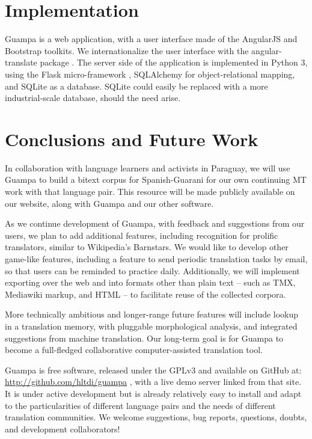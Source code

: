 \documentclass[10pt, a4paper]{article}
\begin{document}
\section{Implementation}
Guampa is a web application, with a user interface made of the AngularJS
\cite{angularjs} and Bootstrap \cite{bootstrap} toolkits. We internationalize
the user interface with the angular-translate package \cite{angular-translate}.
The server side of the application is implemented in Python 3, using the Flask
micro-framework \cite{flask}, SQLAlchemy
\cite{sqlalchemy} for object-relational mapping, and SQLite \cite{sqlite} as a
database. SQLite could easily be replaced with a more industrial-scale
database, should the need arise.

\section{Conclusions and Future Work}
In collaboration with language learners and activists in Paraguay, we will use
Guampa to build a bitext corpus for Spanish-Guarani for our own continuing MT
work with that language pair. This resource will be made publicly available on
our website, along with Guampa and our other software.

As we continue development of Guampa, with feedback and suggestions from our
users, we plan to add additional features, including recognition for prolific
translators, similar to Wikipedia's Barnstars. We would like to develop other
game-like features, including a feature to send periodic translation tasks by
email, so that users can be reminded to practice daily. Additionally, we will
implement exporting over the web and into formats other than plain text -- such
as TMX, Mediawiki markup, and HTML --  to facilitate reuse of the collected
corpora.

More technically ambitious and longer-range future features will include lookup
in a translation memory, with pluggable morphological analysis, and integrated
suggestions from machine translation. Our long-term goal is for Guampa to
become a full-fledged collaborative computer-assisted translation tool.

Guampa is free software, released under the GPLv3 and available on GitHub at:
\\
\url{http://github.com/hltdi/guampa} , with a live demo server linked from that
site. It is under active development but is already relatively easy to install
and adapt to the particularities of different language pairs and the needs of
different translation communities. We welcome suggestions, bug reports,
questions, doubts, and development collaborators!



\end{document}
